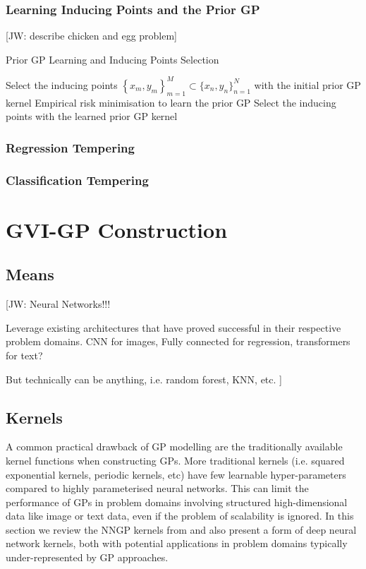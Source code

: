 \documentclass{article}
\newcommand{\jw}[1]{{\color{gray} [JW: #1]}}
\numberwithin{equation}{section}
\begin{document}
\subsubsection{Learning Inducing Points and the Prior GP}
\jw{describe chicken and egg problem}


\begin{algorithm}
\caption{Prior GP Learning and Inducing Points Selection}\label{alg:gvi-gp}
\begin{algorithmic}
 \State Select the inducing points $\left\{x_m, y_m\right\}_{m=1}^{M} \subset \{x_n, y_n\}_{n=1}^{N}$ with the initial prior GP kernel
\State Empirical risk minimisation to learn the prior GP
\State  Select the inducing points with the learned prior GP kernel
\EndWhile
\end{algorithmic}
\end{algorithm}

\subsubsection{Regression Tempering}
\subsubsection{Classification Tempering}

\newpage
\section{GVI-GP Construction}\label{section:gvi-gp-construction}
\subsection{Means}
\jw{
Neural Networks!!!

Leverage existing architectures that have proved successful in their respective problem domains. CNN for images, Fully connected for regression, transformers for text?

But technically can be anything, i.e. random forest, KNN, etc.
}

\subsection{Kernels}\label{section:kernels}
A common practical drawback of GP modelling are the traditionally available kernel functions when constructing GPs. More traditional kernels (i.e. squared exponential kernels, periodic kernels, etc) have few learnable hyper-parameters compared to highly parameterised neural networks. This can limit the performance of GPs in problem domains involving structured high-dimensional data like image or text data, even if the problem of scalability is ignored. In this section we review the NNGP kernels from \cite{novak2019neural} and also present a form of deep neural network kernels, both with potential applications in problem domains typically under-represented by GP approaches.
\end{document}
